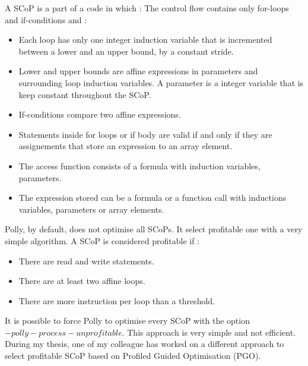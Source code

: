 \begin{definition}{}
A SCoP is a part of a code in which :
The control flow contains only for-loops and if-conditions and :
\begin{itemize}
\item Each loop has only one integer induction variable that is incremented between a lower and an upper bound, by a constant stride.
\item Lower and upper bounds are affine expressions in parameters and surrounding loop induction variables. A parameter is a integer variable that is keep constant throughout the SCoP.
\item If-conditions compare two affine expressions.
\item Statements inside for loops or if body are valid if and only if they are assignements that store an expression to an array element.
\item The access function consists of a formula with induction variables, parameters.
\item The expression stored can be a formula or a function call with inductions variables, parameters or array elements.
\end{itemize}\end{definition}

Polly, by default, does not optimise all SCoPs. It select profitable one with a very simple algorithm. A SCoP is considered profitable if :
\begin{itemize}
\item There are read and write statements.
\item There are at least two affine loops. 
\item There are more instruction per loop than a threshold.
\end{itemize}

It is possible to force Polly to optimise every SCoP with the option $-polly-process-unprofitable$. This approach is very simple and not efficient. During my thesis, one of my colleague has worked on a different approach to select profitable SCoP based on Profiled Guided Optimisation (PGO).

